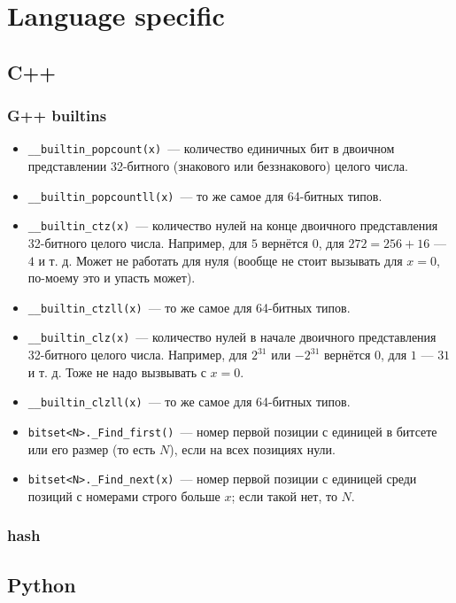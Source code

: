\section{Language specific}

\subsection{C++}

\subsubsection{G++ builtins}

\begin{itemize}
	\item \texttt{\_\_builtin\_popcount(x)}~--- количество единичных бит в двоичном представлении 32-битного (знакового или беззнакового) целого числа.
	\item \texttt{\_\_builtin\_popcountll(x)}~--- то же самое для 64-битных типов.
	\item \texttt{\_\_builtin\_ctz(x)}~--- количество нулей на конце двоичного представления 32-битного целого числа. Например, для $5$ вернётся $0$, для $272 = 256 + 16$ --- $4$ и т. д. Может не работать для нуля (вообще не стоит вызывать для $x = 0$, по-моему это и упасть может).
	\item \texttt{\_\_builtin\_ctzll(x)}~--- то же самое для 64-битных типов.
	\item \texttt{\_\_builtin\_clz(x)}~--- количество нулей в начале двоичного представления 32-битного целого числа. Например, для $2^{31}$ или $-2^{31}$ вернётся
		$0$, для $1$ --- $31$ и т. д. Тоже не надо вызвывать с $x = 0$.
	\item \texttt{\_\_builtin\_clzll(x)}~--- то же самое для 64-битных типов.

	\item \texttt{bitset<N>.\_Find\_first()}~--- номер первой позиции с единицей в битсете или его размер
		(то есть $N$), если на всех позициях нули.
	\item \texttt{bitset<N>.\_Find\_next(x)}~--- номер первой позиции с единицей среди позиций с номерами строго больше $x$; если такой нет, то $N$.
\end{itemize}

\subsubsection{hash}



\subsection{Python}


